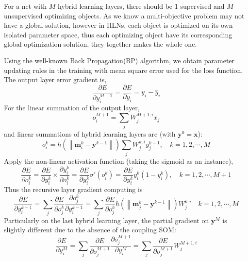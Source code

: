 \documentclass[3p,times,procedia]{elsarticle}
\begin{document}
For a net with $M$ hybrid learning layers,
there should be 1 supervised
and $M$ unsupervised optimizing objects.
As we know a multi-objective problem may not 
have a global solution, however in HLNs,
each object is optimized on its own isolated
parameter space, thus each optimizing object
have its corresponding global optimization 
solution, they together makes the whole one.

Using the well-known Back Propagation(BP)
algorithm, we obtain parameter updating
rules in the training with mean square error 
used for the loss function. 
The output layer error gradient is,
\begin{equation}
	\frac{\partial E}
	{\partial y_i^{M+1}}=
	\frac{\partial E}
	{\partial y_i}=
	y_i-\hat{y}_i
	\label{eq:21}
\end{equation}
For the linear summation of the output layer,
\begin{equation}
	o_i^{M+1}=
	\sum_j
	W_j^{M+1,i}
	x_j
	\label{eq:22}
\end{equation}
and linear summations of hybrid learning
layers are (with $\mathbf{y}^0=\mathbf{x}$):
\begin{equation}
	o_i^k =
	h\left(
	\left\|
	\mathbf{m}_i^k-\mathbf{y}^{k-1}
	\right\|
	\right)
	\sum_j 
	W_j^{k,i}
	y_j^{k-1},
	\quad k=1,2,\cdots,M
	\label{eq:23}
\end{equation}
Apply the non-linear activation function
(taking the sigmoid as an instance),
\begin{equation}
	\frac{\partial E}
	{\partial o_i^k}=
	\frac{\partial E}
	{\partial y_i^k}\times
	\frac{\partial y_i^k}
	{\partial o_i^k}=
	\frac{\partial E}
	{\partial y_i^k}
	\sigma'(o_i^k)=
	\frac{\partial E}
	{\partial y_i^k}
	y_i^k\left(
	1-y_i^k
	\right),
	\quad k=1,2,\cdots,M+1
	\label{eq:24}
\end{equation}
Thus the recursive layer gradient computing
is
\begin{equation}
	\frac{\partial E}
	{\partial y_i^{k-1}}=\sum_j
	\frac{\partial E}
	{\partial o_j^k}
	\frac{\partial o_j^k}
	{\partial y_i^{k-1}}=\sum_j
	\frac{\partial E}
	{\partial o_j^k}
	h\left(
	\left\|
	\mathbf{m}_j^k-
	\mathbf{y}^{k-1}
	\right\|
	\right)
	W_j^{k,i}
	\quad k=1,2,\cdots,M
	\label{eq:25}
\end{equation}
Particularly on the last hybrid learning
layer, the partial gradient on 
$\mathbf{y}^M$ is slightly different due
to the absence of the coupling SOM:
\begin{equation}
	\frac{\partial E}
	{\partial y_i^M}=\sum_j
	\frac{\partial E}
	{\partial o_j^{M+1}}
	\frac{\partial o_j^{M+1}}
	{\partial y_i^M}=\sum_j
	\frac{\partial E}
	{\partial o_j^{M+1}}
	W_j^{M+1,i}
	\label{eq:26}
\end{equation}
\end{document}

